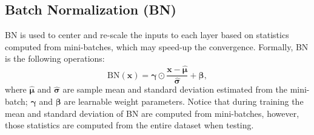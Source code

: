 \subsection{Batch Normalization (BN)}
    BN is used to center and re-scale the inputs to each layer based on statistics computed from mini-batches, which may speed-up the convergence.
    Formally, BN is the following operations:
        \begin{equation}
            \text{BN}(\bm{x}) = \bm{\gamma} \odot \frac{\bm{x} - \hat{\bm{\mu}} }{\hat{\bm{\sigma}}} + \bm{\beta},
        \end{equation}
    where $\hat{\bm{\mu}}$ and $\hat{\bm{\sigma}}$ are sample mean and standard deviation estimated from the mini-batch; $\bm{\gamma}$ and $\bm{\beta}$ are learnable weight parameters.
    Notice that during training the mean and standard deviation of BN are computed from mini-batches, however, those statistics are computed from the entire dataset when testing.
        
    